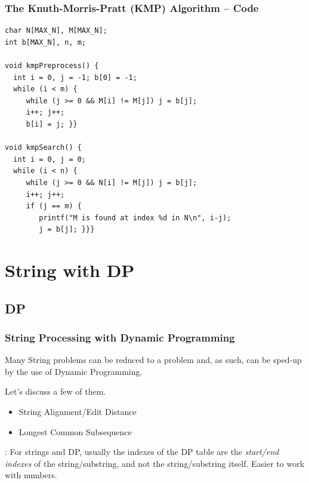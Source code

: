 \documentclass{beamer}
\begin{document}
\begin{frame}
  \frametitle{The Knuth-Morris-Pratt (KMP) Algorithm -- Code}
  {\smaller
  \begin{exampleblock}{}
\begin{verbatim}
char N[MAX_N], M[MAX_N]; 
int b[MAX_N], n, m;

void kmpPreprocess() {
  int i = 0, j = -1; b[0] = -1;
  while (i < m) {
     while (j >= 0 && M[i] != M[j]) j = b[j];
     i++; j++;
     b[i] = j; }}

void kmpSearch() {
  int i = 0, j = 0;
  while (i < n) {
     while (j >= 0 && N[i] != M[j]) j = b[j];
     i++; j++;
     if (j == m) {
        printf("M is found at index %d in N\n", i-j);
        j = b[j]; }}}
\end{verbatim}
  \end{exampleblock}
  }
\end{frame}

\section{String with DP} %
\subsection{DP}
\begin{frame}
  \frametitle{String Processing with Dynamic Programming}
  {\smaller
  \begin{block}{}
    Many String problems can be reduced to a 
    problem and, as such, can be sped-up by the use of Dynamic
    Programming.
    
    \bigskip

    Let's discuss a few of them.
  \end{block}

  \begin{itemize}
  \item String Alignment/Edit Distance
  \item Longest Common Subsequence
  \end{itemize}

  \bigskip

  : For strings and DP, usually the indexes of the DP
  table are the \emph{start/end indexes} of the string/substring, and
  not the string/substring itself. Easier to work with numbers.}
\end{frame}
\end{document}
